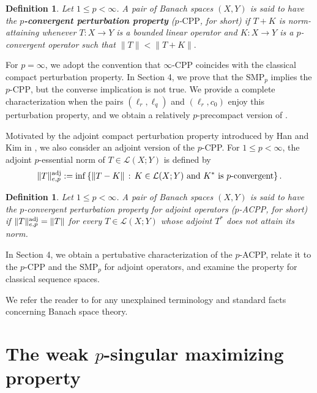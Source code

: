 \documentclass[12 pt]{article}%
\newtheorem{final remark}[theorem]{Final Remark}
\newtheorem{definition}[theorem]{Definition}
\newcommand{\norma}[1]{\| #1 \|}
\newcommand{\conj}[2]{\left \{ {#1} \, : \, {#2} \right \}}
\begin{document}
\begin{definition}\label{pcpp}
Let $1\leq p<\infty$. A pair of Banach spaces $(X,Y)$ is said to have the \textbf{$p$-convergent perturbation property} ($p$-$\mathrm{CPP}$, for short) if $T+K$ is norm-attaining whenever $T:X\to Y$ is a bounded linear operator and $K:X\to Y$ is a $p$-convergent operator such that $\|T\|<\|T+K\|.$
\end{definition}



For $p=\infty$, we adopt the convention that $\infty$-$\mathrm{CPP}$ coincides with the classical compact perturbation property. In Section 4, we prove that the $\mathrm{SMP}_p$ implies the $p$-$\mathrm{CPP}$, but the converse implication is not true. We provide a complete characterization when the pairs $(\ell_r, \ell_q)$ and $(\ell_r, c_0)$ enjoy this perturbation property, and we obtain a relatively $p$-precompact version of \cite[Theorem 2.1]{jung}. 

Motivated by the adjoint compact perturbation property introduced by Han and Kim in \cite{han}, we also consider an adjoint version of the $p$-CPP. For $1 \leq p < \infty$, the adjoint $p$-essential norm of $T \in \mathcal{L}(X; Y)$ is defined by
$$ \norma{T}_{e,p}^{\rm adj} := \inf \conj{\norma{T-K}}{K \in \mathcal{L}(X; Y) \text{ and } K^* \text{ is $p$-convergent}}. $$


\begin{definition}
\label{adpcpp}
Let $ 1 \leq p < \infty$. A pair of Banach spaces $(X, Y)$ is said to have the $p$-convergent perturbation property for adjoint operators ($p$-ACPP, for short) if $\norma{T}_{e,p}^{\rm adj} = \norma{T}$ for every $T \in \mathcal{L}(X; Y)$ whose adjoint $T^*$ does not attain its norm. 
\end{definition}

In Section 4, we obtain a pertubative characterization of the $p$-ACPP, relate it to the $p$-CPP and the $\mathrm{SMP}_p$ for adjoint operators, and examine the property for classical sequence spaces.


We refer the reader to \cite{albiac, geraldo, fabianhabala} for any unexplained terminology and standard facts concerning Banach space theory.



\section{The weak $p$-singular maximizing property}
\end{document}
